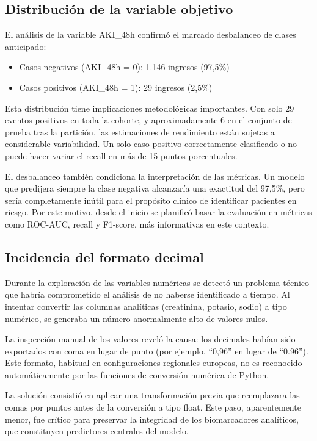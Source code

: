 \documentclass[12pt, a4paper, oneside]{report}
\begin{document}
\subsection{Distribución de la variable objetivo}

El análisis de la variable AKI\_48h confirmó el marcado desbalanceo de clases anticipado:

\begin{itemize}
    \item Casos negativos (AKI\_48h = 0): 1.146 ingresos (97,5\%)
    \item Casos positivos (AKI\_48h = 1): 29 ingresos (2,5\%)
\end{itemize}

Esta distribución tiene implicaciones metodológicas importantes. Con solo 29 eventos positivos en toda la cohorte, y aproximadamente 6 en el conjunto de prueba tras la partición, las estimaciones de rendimiento están sujetas a considerable variabilidad. Un solo caso positivo correctamente clasificado o no puede hacer variar el recall en más de 15 puntos porcentuales.

El desbalanceo también condiciona la interpretación de las métricas. Un modelo que predijera siempre la clase negativa alcanzaría una exactitud del 97,5\%, pero sería completamente inútil para el propósito clínico de identificar pacientes en riesgo. Por este motivo, desde el inicio se planificó basar la evaluación en métricas como ROC-AUC, recall y F1-score, más informativas en este contexto.

\subsection{Incidencia del formato decimal}

Durante la exploración de las variables numéricas se detectó un problema técnico que habría comprometido el análisis de no haberse identificado a tiempo. Al intentar convertir las columnas analíticas (creatinina, potasio, sodio) a tipo numérico, se generaba un número anormalmente alto de valores nulos.

La inspección manual de los valores reveló la causa: los decimales habían sido exportados con coma en lugar de punto (por ejemplo, ``0,96'' en lugar de ``0.96''). Este formato, habitual en configuraciones regionales europeas, no es reconocido automáticamente por las funciones de conversión numérica de Python.

La solución consistió en aplicar una transformación previa que reemplazara las comas por puntos antes de la conversión a tipo float. Este paso, aparentemente menor, fue crítico para preservar la integridad de los biomarcadores analíticos, que constituyen predictores centrales del modelo.
\end{document}
